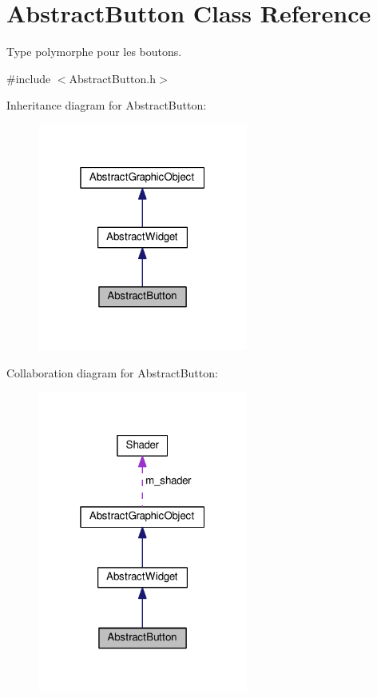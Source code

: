 \hypertarget{classAbstractButton}{\section{Abstract\+Button Class Reference}
\label{classAbstractButton}
}


Type polymorphe pour les boutons.  




{\ttfamily \#include $<$Abstract\+Button.\+h$>$}



Inheritance diagram for Abstract\+Button\+:
\nopagebreak
\begin{figure}[H]
\begin{center}
\leavevmode
\includegraphics[width=196pt]{classAbstractButton__inherit__graph}
\end{center}
\end{figure}


Collaboration diagram for Abstract\+Button\+:
\nopagebreak
\begin{figure}[H]
\begin{center}
\leavevmode
\includegraphics[width=196pt]{classAbstractButton__coll__graph}
\end{center}
\end{figure}
